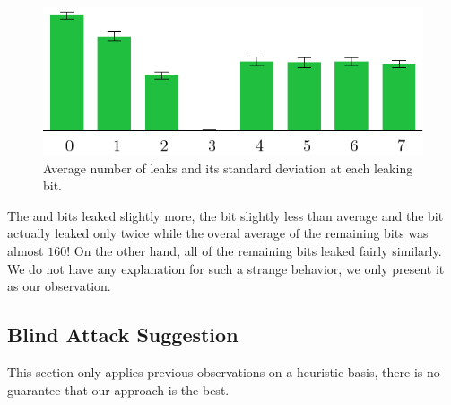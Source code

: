 	\begin{figure}[h]
	\begin{center}
		\includegraphics{figures/leak_bit/leak_bit.pdf}
		\caption{Average number of leaks and its standard deviation at each leaking bit.}
		\label{fig:leakbitall}
	\end{center}
	\end{figure}
	
	The  and  bits leaked slightly more, the  bit slightly less than average and the  bit actually leaked only twice while the overal average of the remaining bits was almost $160$! On the other hand, all of the remaining bits leaked fairly similarly. We do not have any explanation for such a strange behavior, we only present it as our observation.



\subsection{Blind Attack Suggestion}
\label{sec:subblindattack}

\begin{note}
	This section only applies previous observations on a heuristic basis, there is no guarantee that our approach is the best.
\end{note}

